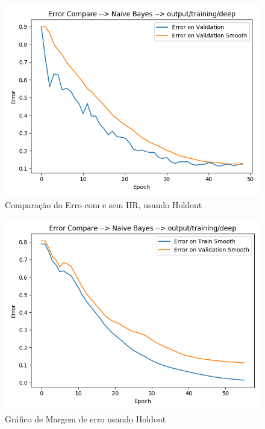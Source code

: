 \documentclass[
article,			%
11pt,				%
oneside,			%
a4paper,			%
english,			%
brazil,				%
sumario=tradicional,
]{abntex2}
\begin{document}
	
	\begin{anexosenv}
		
		\begin{figure}[htb]
			\caption{\label{fig_smooth_example} Comparação do Erro com e sem IIR, usando Holdout}
			\begin{center}
				\includegraphics[scale=0.5]{smooth_compare.png}
			\end{center}
		\end{figure}
		
		\begin{figure}[htb]
			\caption{\label{error-naive-bayes-holdout}Gráfico de Margem de erro usando Holdout}
			\begin{center}
				\includegraphics[scale=0.5]{error-naive-bayes-holdout.png}
			\end{center}
		\end{figure}


\end{anexosenv}
\end{document}

